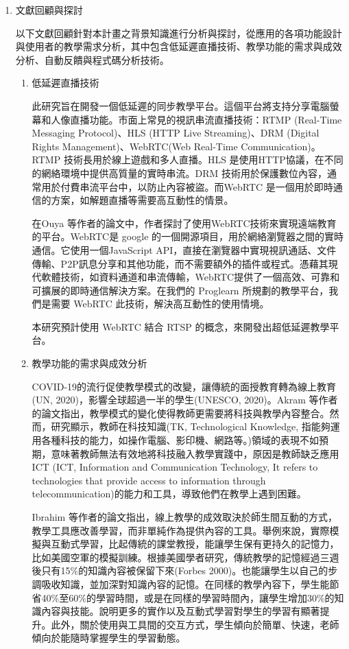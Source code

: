 \documentclass[12pt]{article}
\begin{document}
\begin{enumerate}
  \item 文獻回顧與探討
    \par 以下文獻回顧針對本計畫之背景知識進行分析與探討，從應用的各項功能設計與使用者的教學需求分析，其中包含低延遲直播技術、教學功能的需求與成效分析、自動反饋與程式碼分析技術。
    \begin{enumerate}
      \setlength{\parindent}{2em}
      \item 低延遲直播技術
        \par 此研究旨在開發一個低延遲的同步教學平台。這個平台將支持分享電腦螢幕和人像直播功能。市面上常見的視訊串流直播技術：RTMP (Real-Time Messaging Protocol)、HLS (HTTP Live Streaming)、DRM (Digital Rights Management)、WebRTC(Web Real-Time Communication)。RTMP 技術長用於線上遊戲和多人直播。HLS 是使用HTTP協議，在不同的網絡環境中提供高質量的實時串流。DRM 技術用於保護數位內容，通常用於付費串流平台中，以防止內容被盜。而WebRTC 是一個用於即時通信的方案，如解題直播等需要高互動性的情景。
        \par 在Ouya %
        等作者的論文中\cite{ref13}，作者探討了使用WebRTC技術來實現遠端教育的平台。WebRTC是 google 的一個開源項目，用於網絡瀏覽器之間的實時通信。它使用一個JavaScript API，直接在瀏覽器中實現視訊通話、文件傳輸、P2P訊息分享和其他功能，而不需要額外的插件或程式。憑藉其現代軟體技術，如資料通道和串流傳輸，WebRTC提供了一個高效、可靠和可擴展的即時通信解決方案。在我們的 Proglearn 所規劃的教學平台，我們是需要 WebRTC 此技術，解決高互動性的使用情境。
        \par 本研究預計使用 WebRTC 結合 RTSP 的概念，來開發出超低延遲教學平台。
      \item 教學功能的需求與成效分析
        \par COVID-19的流行促使教學模式的改變，讓傳統的面授教育轉為線上教育(UN, 2020)\cite{ref8}，影響全球超過一半的學生(UNESCO, 2020)\cite{ref9}。Akram %
        等作者的論文\cite{ref15}指出，教學模式的變化使得教師更需要將科技與教學內容整合。然而，研究顯示，教師在科技知識(TK, Technological Knowledge, 指能夠運用各種科技的能力，如操作電腦、影印機、網路等。)\cite{ref10}領域的表現不如預期，意味著教師無法有效地將科技融入教學實踐中，原因是教師缺乏應用ICT (ICT, Information and Communication Technology, It refers to technologies that provide access to information through telecommunication)\cite{ref11}的能力和工具，導致他們在教學上遇到困難。
        \par Ibrahim %
        等作者的論文\cite{ref14}指出，線上教學的成效取決於師生間互動的方式，教學工具應改善學習，而非單純作為提供內容的工具。舉例來說，實際模擬與互動式學習，比起傳統的課堂教授，能讓學生保有更持久的記憶力，比如美國空軍的模擬訓練。根據美國學者研究，傳統教學的記憶經過三週後只有15\%的知識內容被保留下來(Forbes 2000)\cite{ref12}。也能讓學生以自己的步調吸收知識，並加深對知識內容的記憶。在同樣的教學內容下，學生能節省40\%至60\%的學習時間，或是在同樣的學習時間內，讓學生增加30\%的知識內容與技能。說明更多的實作以及互動式學習對學生的學習有顯著提升。此外，關於使用與工具間的交互方式，學生傾向於簡單、快速，老師傾向於能隨時掌握學生的學習動態。

\end{enumerate}
\end{enumerate}
\end{document}
